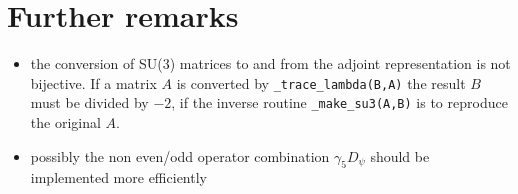 \section{Further remarks}
\begin{itemize}
\item{}the conversion of SU(3) matrices to and from the adjoint representation is not bijective. If a matrix $A$ is converted by \texttt{\_trace\_lambda(B,A)} the result $B$ must be divided by $-2$, if the inverse routine \texttt{\_make\_su3(A,B)} is to reproduce the original $A$.  
\item{}possibly the non even/odd operator combination $\gamma_5 D_\psi$ should be implemented more efficiently 
\end{itemize}
